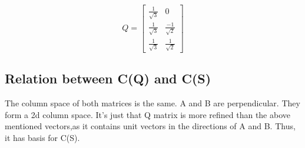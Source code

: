 \documentclass[]{article}
\begin{document}
\noindent
\[
Q=\begin{bmatrix}
	\frac{1}{\sqrt{3}}&0\\
	\frac{1}{\sqrt{3}}&\frac{-1}{\sqrt{2}}\\
	\frac{1}{\sqrt{3}}&\frac{1}{\sqrt{2}}
\end{bmatrix}
\]
\vspace{10pt}

\subsection{Relation between C(Q) and C(S)}
\vspace{10pt}	
The column space of both matrices is the same. A and B are perpendicular. They form a 2d column space. It's just that Q matrix is more refined than the above mentioned vectors,as it contains unit vectors in the directions of A and B. Thus, it has basis for C(S).
\end{document}
